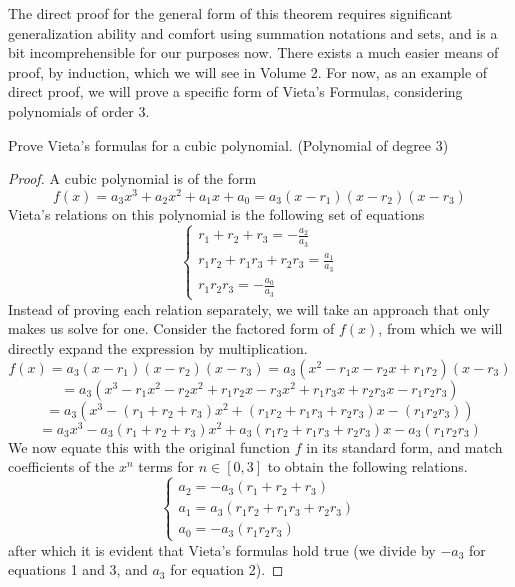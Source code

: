 The direct proof for the general form of this theorem requires significant generalization ability and comfort using summation notations and sets, and is a bit incomprehensible for our purposes now. There exists a much easier means of proof, by induction, which we will see in Volume 2. For now, as an example of direct proof, we will prove a specific form of Vieta's Formulas, considering polynomials of order 3. 

\begin{example}
Prove Vieta's formulas for a cubic polynomial. (Polynomial of degree 3)
\end{example}
\begin{proof}
A cubic polynomial is of the form
\[
f(x) = a_3x^3 + a_2x^2 + a_1x + a_0 = a_3(x-r_1)(x-r_2)(x-r_3)
\]
Vieta's relations on this polynomial is the following set of equations
\[
\begin{cases}
r_1 + r_2 + r_3 = -\frac{a_2}{a_3} \\
r_1r_2 + r_1r_3 + r_2r_3 = \frac{a_1}{a_3} \\
r_1r_2r_3 = -\frac{a_0}{a_3}
\end{cases}
\]
Instead of proving each relation separately, we will take an approach that only makes us solve for one. Consider the factored form of $f(x)$, from which we will directly expand the expression by multiplication.
\[
f(x) = a_3(x-r_1)(x-r_2)(x-r_3) = a_3(x^2 - r_1x - r_2x + r_1r_2)(x-r_3)
\]
\[
= a_3(x^3 - r_1x^2 - r_2x^2 + r_1r_2x - r_3x^2 + r_1r_3x + r_2r_3x - r_1r_2r_3)
\]
\[
= a_3(x^3 - (r_1 + r_2 + r_3)x^2 + (r_1r_2 + r_1r_3 + r_2r_3)x - (r_1r_2r_3))
\]
\[
= a_3x^3 - a_3(r_1 + r_2 + r_3)x^2 + a_3(r_1r_2 + r_1r_3 + r_2r_3)x - a_3(r_1r_2r_3)
\]
We now equate this with the original function $f$ in its standard form, and match coefficients of the $x^n$ terms for $n \in [0, 3]$ to obtain the following relations.
\[
\begin{cases}
a_2 = -a_3(r_1 + r_2 + r_3) \\
a_1 = a_3(r_1r_2 + r_1r_3 + r_2r_3) \\
a_0 = -a_3(r_1r_2r_3)
\end{cases}
\]
after which it is evident that Vieta's formulas hold true (we divide by $-a_3$ for equations 1 and 3, and $a_3$ for equation 2).  
\end{proof}

